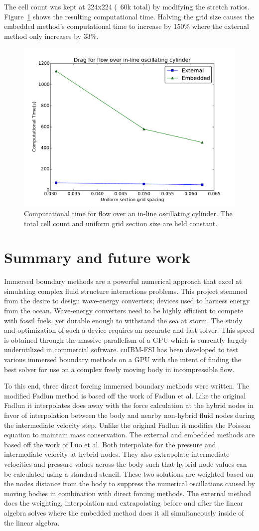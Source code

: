 The cell count was kept at 224x224 (~60k total) by modifying the stretch ratios. 
Figure~\ref{fig:performance2} shows the resulting computational time. 
Halving the grid size causes the embedded method's computational time to increase by 150\% where the external method only increases by 33\%.
\begin{figure}[!htb]
	\centering
	\includegraphics[width=0.4\linewidth]{performance_oscflow2}
	\caption{Computational time for flow over an in-line oscillating cylinder. The total cell count and uniform grid section size are held constant.}
	\label{fig:performance2}
\end{figure}

\chapter{Summary and future work} 
Immersed boundary methods are a powerful numerical approach that excel at simulating complex fluid structure interactions problems. 
This project stemmed from the desire to design wave-energy converters; devices used to harness energy from the ocean. 
Wave-energy converters need to be highly efficient to compete with fossil fuels, yet durable enough to withstand the sea at storm. 
The study and optimization of such a device requires an accurate and fast solver. 
This speed is obtained through the massive parallelism of a GPU which is currently largely underutilized in commercial software. 
cuIBM-FSI has been developed to test various immersed boundary methods on a GPU with the intent of finding the best solver for use on a complex freely moving body in incompressible flow. 

To this end, three direct forcing immersed boundary methods were written.  
The modified Fadlun method is based off the work of Fadlun et al\cite{Fadlun:2000fl}. 
Like the original Fadlun it interpolates does away with the force calculation at the hybrid nodes in favor of interpolation between the body and nearby non-hybrid fluid nodes during the intermediate velocity step. 
Unlike the original Fadlun it modifies the Poisson equation to maintain mass conservation. 
The external and embedded methods are based off the work of Luo et al\cite{Luo:2012gx}. 
Both interpolate for the pressure and intermediate velocity at hybrid nodes. 
They also extrapolate intermediate velocities and pressure values across the body such that hybrid node values can be calculated using a standard stencil. 
These two solutions are weighted based on the nodes distance from the body to suppress the numerical oscillations caused by moving bodies in combination with direct forcing methods. 
The external method does the weighting, interpolation and extrapolating before and after the linear algebra solves where the embedded method does it all simultaneously inside of the linear algebra. 

